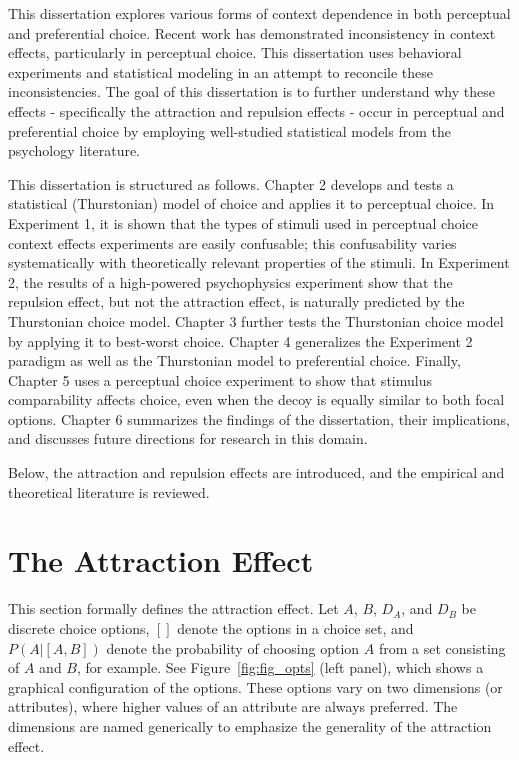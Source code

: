 This dissertation explores various forms of context dependence in both perceptual and preferential choice. Recent work has demonstrated inconsistency in context effects, particularly in perceptual choice. This dissertation uses behavioral experiments and statistical modeling in an attempt to reconcile these inconsistencies. The goal of this dissertation is to further understand why these effects - specifically the attraction and repulsion effects - occur in perceptual and preferential choice by employing well-studied statistical models from the psychology literature.

This dissertation is structured as follows. Chapter 2 develops and tests a statistical (Thurstonian) model of choice and applies it to perceptual choice. In Experiment 1, it is shown that the types of stimuli used in perceptual choice context effects experiments are easily confusable; this confusability varies systematically with theoretically relevant properties of the stimuli. In Experiment 2, the results of a high-powered psychophysics experiment show that the repulsion effect, but not the attraction effect, is naturally predicted by the Thurstonian choice model. Chapter 3 further tests the Thurstonian choice model by applying it to best-worst choice. Chapter 4 generalizes the Experiment 2 paradigm as well as the Thurstonian model to preferential choice. Finally, Chapter 5 uses a perceptual choice experiment to show that stimulus comparability affects choice, even when the decoy is equally similar to both focal options. Chapter 6 summarizes the findings of the dissertation, their implications, and discusses future directions for research in this domain. 

Below, the attraction and repulsion effects are introduced, and the empirical and theoretical literature is reviewed.

\section{The Attraction Effect}
This section formally defines the attraction effect. Let $A$, $B$, $D_{A}$, and $D_{B}$ be discrete choice options, $[]$ denote the options in a choice set, and $P(A|[A,B])$ denote the probability of choosing option $A$ from a set consisting of $A$ and $B$, for example. See Figure~\ref{fig:fig_opts} (left panel), which shows a graphical configuration of the options. These options vary on two dimensions (or attributes), where higher values of an attribute are always preferred. The dimensions are named generically to emphasize the generality of the attraction effect.

